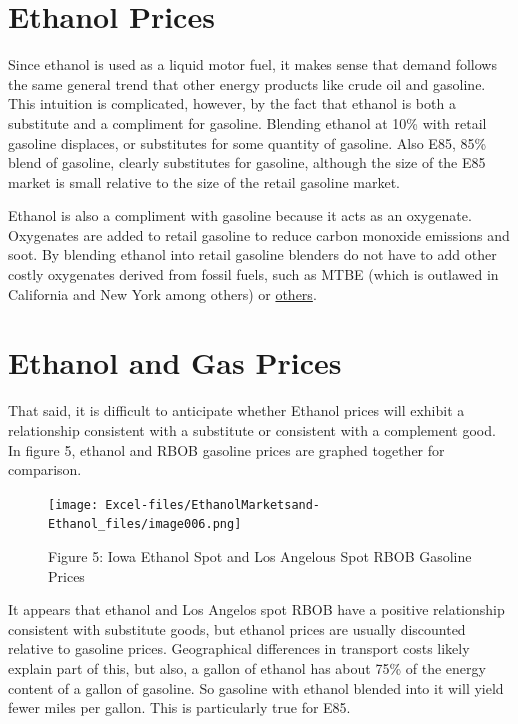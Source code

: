 \documentclass[
]{book}
\begin{document}
\hypertarget{ethanol-prices}{%
\section{Ethanol Prices}\label{ethanol-prices}}

Since ethanol is used as a liquid motor fuel, it makes sense that demand follows the same general trend that other energy products like crude oil and gasoline. This intuition is complicated, however, by the fact that ethanol is both a substitute and a compliment for gasoline. Blending ethanol at 10\% with retail gasoline displaces, or substitutes for some quantity of gasoline. Also E85, 85\% blend of gasoline, clearly substitutes for gasoline, although the size of the E85 market is small relative to the size of the retail gasoline market.

Ethanol is also a compliment with gasoline because it acts as an oxygenate. Oxygenates are added to retail gasoline to reduce carbon monoxide emissions and soot. By blending ethanol into retail gasoline blenders do not have to add other costly oxygenates derived from fossil fuels, such as MTBE (which is outlawed in California and New York among others) or \href{https://en.wikipedia.org/wiki/Oxygenate}{others}.

\hypertarget{ethanol-and-gas-prices}{%
\section{Ethanol and Gas Prices}\label{ethanol-and-gas-prices}}

That said, it is difficult to anticipate whether Ethanol prices will exhibit a relationship consistent with a substitute or consistent with a complement good. In figure 5, ethanol and RBOB gasoline prices are graphed together for comparison.

\begin{figure}
\centering
\texttt{[image: Excel-files/EthanolMarketsand-Ethanol\_files/image006.png]}
\caption{Figure 5: Iowa Ethanol Spot and Los Angelous Spot RBOB Gasoline Prices}
\end{figure}

It appears that ethanol and Los Angelos spot RBOB have a positive relationship consistent with substitute goods, but ethanol prices are usually discounted relative to gasoline prices. Geographical differences in transport costs likely explain part of this, but also, a gallon of ethanol has about 75\% of the energy content of a gallon of gasoline. So gasoline with ethanol blended into it will yield fewer miles per gallon. This is particularly true for E85.
\end{document}
